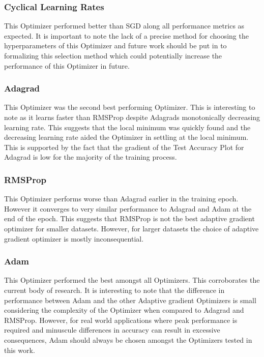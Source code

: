 \documentclass{article}
\begin{document}
\subsubsection{Cyclical Learning Rates}
This Optimizer performed better than SGD along all performance metrics as expected. It is important to note the lack of a precise method for choosing the hyperparameters of this Optimizer and future work should be put in to formalizing this selection method which could potentially increase the performance of this Optimizer in future.

\subsubsection{Adagrad}
This Optimizer was the second best performing Optimizer. This is interesting to note as it learns faster than RMSProp despite Adagrads monotonically decreasing learning rate. This suggests that the local minimum was quickly found and the decreasing learning rate aided the Optimizer in settling at the local minimum. This is supported by the fact that the gradient of the Test Accuracy Plot for Adagrad is low for the majority of the training process. 

\subsubsection{RMSProp}
This Optimizer performs worse than Adagrad earlier in the training epoch. However it converges to very similar performance to Adagrad and Adam at the end of the epoch. This suggests that RMSProp is not the best adaptive gradient optimizer for smaller datasets. However, for larger datasets the choice of adaptive gradient optimizer is mostly inconsequential. 

\subsubsection{Adam}

This Optimizer performed the best amongst all Optimizers. This corroborates the current body of research. It is interesting to note that the difference in performance between Adam and the other Adaptive gradient Optimizers is small considering the complexity of the Optimizer when compared to Adagrad and RMSProp. However, for real world applications where peak performance is required and minuscule differences in accuracy can result in excessive consequences, Adam should always be chosen amongst the Optimizers tested in this work. 
 
\end{document}
